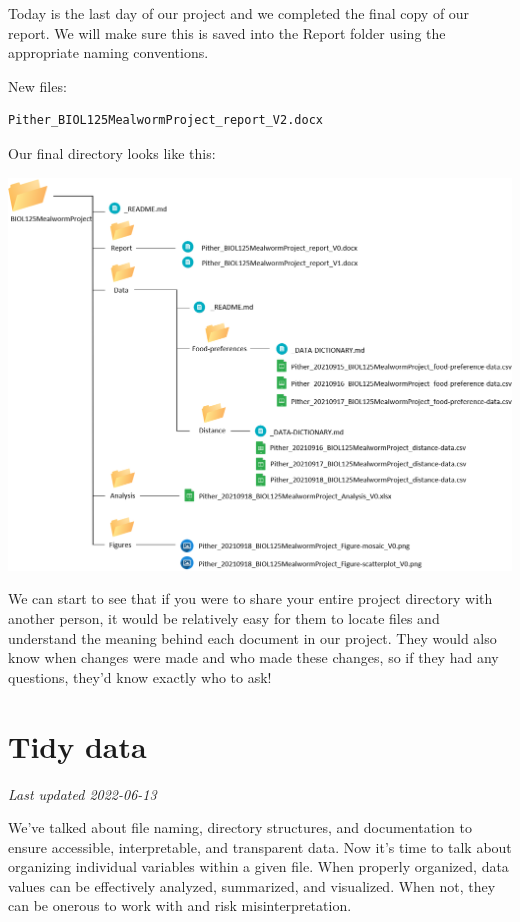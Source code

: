 \documentclass[
]{book}
\begin{document}
Today is the last day of our project and we completed the final copy of our report. We will make sure this is saved into the Report folder using the appropriate naming conventions.

New files:

\begin{verbatim}
Pither_BIOL125MealwormProject_report_V2.docx
\end{verbatim}

Our final directory looks like this:

\includegraphics{images/DS_directory-example-5.png}

We can start to see that if you were to share your entire project directory with another person, it would be relatively easy for them to locate files and understand the meaning behind each document in our project. They would also know when changes were made and who made these changes, so if they had any questions, they'd know exactly who to ask!

\hypertarget{tidy-data}{%
\chapter{Tidy data}\label{tidy-data}}

\emph{Last updated 2022-06-13}

We've talked about file naming, directory structures, and documentation to ensure accessible, interpretable, and transparent data. Now it's time to talk about organizing individual variables within a given file. When properly organized, data values can be effectively analyzed, summarized, and visualized. When not, they can be onerous to work with and risk misinterpretation.
\end{document}
